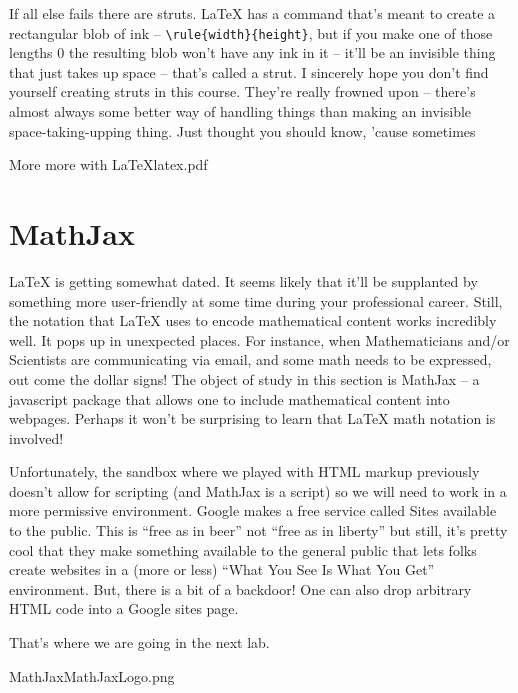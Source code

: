 If all else fails there are struts.  \LaTeX{} has a command that's meant to create a rectangular blob of ink -- 
\verb+\rule{width}{height}+, but if you make one of those lengths $0$ the resulting blob won't have any ink in it -- it'll be an invisible thing that just takes up space -- that's called a strut.  I sincerely hope you don't find yourself creating struts in this course.  They're really frowned upon -- there's almost always some better way of handling things than making an invisible space-taking-upping thing.  Just thought you should know, 'cause sometimes\textellipsis

\clearpage
\begin{worksheet}{4}{More more with \LaTeX}{latex.pdf}

\end{worksheet}
\clearpage

\section{MathJax}
\label{sec:mathjax}

\LaTeX{} is getting somewhat dated.  It seems likely that it'll be supplanted by something more user-friendly at some time during your professional career.  Still, the notation that \LaTeX{} uses to encode mathematical content works incredibly well.  It pops up in unexpected places.  For instance, when Mathematicians and/or Scientists are communicating via email, and some math needs to be expressed, out come the dollar signs!  The object of study in this section is MathJax -- a javascript package that allows one to include mathematical content into webpages.  Perhaps it won't be surprising to learn that \LaTeX{} math notation is involved!

Unfortunately, the sandbox where we played with HTML markup previously doesn't allow for scripting (and MathJax is a script) so we will need to work in a more permissive environment.  Google makes a free service called Sites available to the public.  This is ``free as in beer'' not ``free as in liberty'' but still, it's pretty cool that they make something available to the general public that lets folks create websites in a (more or less) ``What You See Is What You Get'' environment.  But, there is a bit of a backdoor!  One can also drop arbitrary HTML code into a Google sites page.  

That's where we are going in the next lab.

\clearpage
\begin{worksheet}{5}{MathJax}{MathJaxLogo.png}

\end{worksheet}
\clearpage



